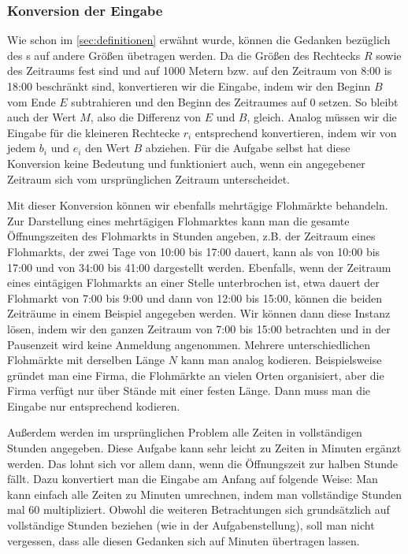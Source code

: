 \subsubsection{Konversion der Eingabe}
Wie schon im \cref{sec:definitionen} erwähnt wurde, können die Gedanken bezüglich des
\fp s auf andere Größen übetragen werden. Da die Größen des Rechtecks $R$ sowie des Zeitraums fest sind
und auf 1000 Metern bzw. auf den Zeitraum von 8:00 is 18:00 beschränkt sind, konvertieren wir
die Eingabe, indem wir den 
Beginn $B$ vom Ende $E$ subtrahieren und den Beginn des Zeitraumes auf 0 setzen.
So bleibt auch der Wert $M$, also die Differenz von $E$ und $B$, gleich. 
Analog müssen wir die Eingabe für die kleineren Rechtecke $r_i$ entsprechend konvertieren, indem wir
von jedem $b_i$ und $e_i$ den Wert $B$ abziehen. Für die Aufgabe selbst hat diese Konversion keine
Bedeutung und funktioniert auch, wenn ein angegebener Zeitraum sich vom ursprünglichen Zeitraum unterscheidet.

Mit dieser Konversion können wir ebenfalls mehrtägige Flohmärkte behandeln.
Zur Darstellung eines mehrtägigen Flohmarktes kann man die gesamte Öffnungszeiten des Flohmarkts in Stunden angeben,
z.B. der Zeitraum eines Flohmarkts, der zwei Tage von 10:00 bis 17:00 dauert,
kann als von 10:00 bis 17:00 und von 34:00 bis 41:00 dargestellt werden. 
Ebenfalls, wenn der Zeitraum eines eintägigen Flohmarkts an einer Stelle unterbrochen ist,
etwa dauert der Flohmarkt von 7:00 bis 9:00 und dann von 12:00 bis 15:00, können die 
beiden Zeiträume in einem Beispiel angegeben werden. Wir können dann diese Instanz lösen,
indem wir den ganzen Zeitraum von 7:00 bis 15:00 betrachten und in der Pausenzeit
wird keine Anmeldung angenommen.
Mehrere unterschiedlichen Flohmärkte mit derselben Länge $N$ kann man analog kodieren.
Beispielsweise gründet man eine Firma, die Flohmärkte an vielen Orten organisiert, aber
die Firma verfügt nur über Stände mit einer festen Länge. Dann muss man die Eingabe nur
entsprechend kodieren.


Außerdem werden im ursprünglichen Problem alle Zeiten in vollständigen Stunden angegeben.
Diese Aufgabe kann sehr leicht zu Zeiten in Minuten ergänzt werden.
Das lohnt sich vor allem dann, wenn die Öffnungszeit zur halben Stunde fällt.
Dazu konvertiert man die Eingabe
am Anfang auf folgende Weise: Man kann einfach alle Zeiten zu Minuten umrechnen, indem
man vollständige Stunden mal 60 multipliziert.
Obwohl die weiteren Betrachtungen sich grundsätzlich auf vollständige Stunden beziehen
(wie in der Aufgabenstellung),
soll man nicht vergessen, dass alle diesen Gedanken sich auf Minuten übertragen lassen.